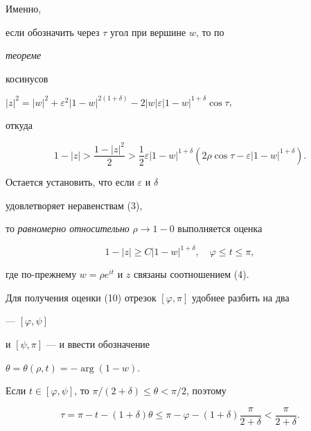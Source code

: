 Именно, 


если обозначить через $\tau$ угол при вершине $w$, то по {\it теореме 


косинусов} 


$|z|^2=|w|^2+\varepsilon^2|1-w|^{2(1+\delta)}-2|w|\varepsilon 


|1-w|^{1+\delta}\cos\tau$, 


откуда 


\begin{equation} 


1-|z|>\frac{1-|z|^2}{2}>\frac{1}{2}\varepsilon 


|1-w|^{1+\delta}(2\rho\cos\tau-\varepsilon 


|1-w|^{1+\delta}). 


\end{equation} 


Остается установить, что если $\varepsilon$ и $\delta$ 


удовлетворяет неравенствам (3), 


то {\it равномерно относительно} $\rho\to1-0$ выполняется оценка 


\begin{equation} 


1-|z|\ge C|1-w|^{1+\delta},\quad 


\varphi\le t\le\pi, 


\end{equation} 


где по-прежнему $w=\rho e^{it}$ и $z$ связаны соотношением (4). 


 


Для получения оценки (10) отрезок $[\varphi,\pi]$ удобнее разбить на два 


--- $[\varphi,\psi]$ 


и $[\psi,\pi]$ --- и ввести обозначение 


$\theta=\theta(\rho,t)=-\arg(1-w)$. 


 


Если $t\in[\varphi,\psi]$, то $\pi/(2+\delta)\le \theta<\pi/2$, поэтому 


\begin{equation} 


\tau=\pi-t-(1+\delta)\theta\le \pi-\varphi-(1+\delta) 


\frac{\pi}{2+\delta}<\frac{\pi}{2+\delta}. 


\end{equation} 


